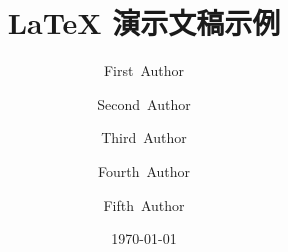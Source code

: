 \documentclass{ctexbeamer}
\title{\LaTeX{} 演示文稿示例}
\author{First~Author \and 
  Second~Author \and
  Third~Author \and
  Fourth~Author \and
  Fifth~Author}
\date{\today}
\begin{document}
\begin{frame}
  \titlepage
\end{frame}
\end{document}
